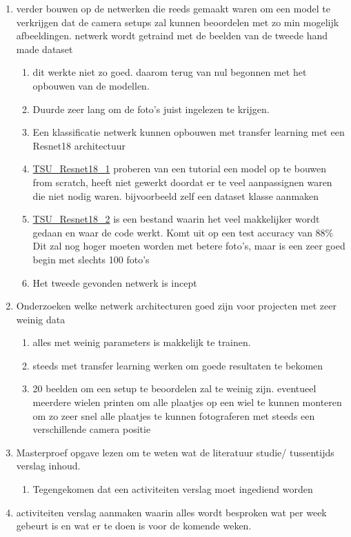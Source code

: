 \documentclass{article}
\begin{document}
\begin{enumerate}[1]
\item verder bouwen op de netwerken die reeds gemaakt waren om een model te verkrijgen dat de camera setups zal kunnen beoordelen met zo min mogelijk afbeeldingen. netwerk wordt getraind met de beelden van de tweede hand made dataset
	\begin{enumerate}[a]
	\item dit werkte niet zo goed. daarom terug van nul begonnen met het opbouwen van de modellen. 
	\item Duurde zeer lang om de foto's juist ingelezen te krijgen.
	\item Een klassificatie netwerk kunnen opbouwen met transfer learning met een Resnet18 architectuur
	\item \href{https://colab.research.google.com/drive/1iUkA7DjNarxSnYvV8T397PHwNeK0OGI1}{TSU\_Resnet18\_1} proberen van een tutorial een model op te bouwen from scratch, heeft niet gewerkt doordat er te veel aanpassignen waren die niet nodig waren. bijvoorbeeld zelf een dataset klasse aanmaken
	\item \href{https://colab.research.google.com/drive/1uh-lWXxS50Y3o4Fly4Wq9ZXmDzeXVAKN}{TSU\_Resnet18\_2} is een bestand waarin het veel makkelijker wordt gedaan en waar de code werkt. Komt uit op een test accuracy van 88\% Dit zal nog hoger moeten worden met betere foto's, maar is een zeer goed begin met slechts 100 foto's
	\item Het tweede gevonden netwerk is incept
	\end{enumerate}
\item Onderzoeken welke netwerk architecturen goed zijn voor projecten met zeer weinig data
	\begin{enumerate}[a]
	\item alles met weinig parameters is makkelijk te trainen. 
	\item steeds met transfer learning werken om goede resultaten te bekomen
	\item 20 beelden om een setup te beoordelen zal te weinig zijn. eventueel meerdere wielen printen om alle plaatjes op een wiel te kunnen monteren om zo zeer snel alle plaatjes te kunnen fotograferen met steeds een verschillende camera positie
	\end{enumerate}
\item Masterproef opgave lezen om te weten wat de literatuur studie/ tussentijds verslag inhoud.
	\begin{enumerate}[a]
	\item Tegengekomen dat een activiteiten verslag moet ingediend worden 
	\end{enumerate}
\item activiteiten verslag aanmaken waarin alles wordt besproken wat per week gebeurt is en wat er te doen is voor de komende weken.
\end{enumerate}
\end{document}

